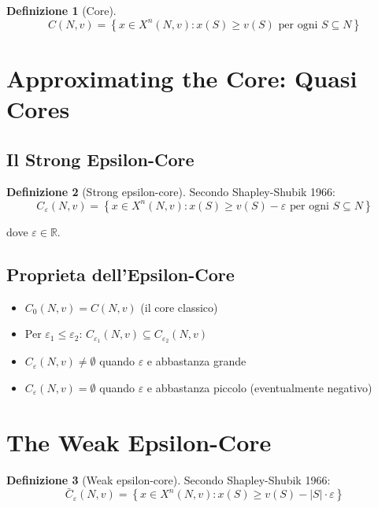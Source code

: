 \documentclass[12pt,a4paper]{article}
\theoremstyle{definition}
\newtheorem{definition}{Definizione}[section]
\begin{document}
\begin{definition}[Core]
\[
C(N, v) = \left\{ x \in X^n(N, v) : x(S) \geq v(S) \text{ per ogni } S \subseteq N \right\}
\]
\end{definition}

\newpage

\section{Approximating the Core: Quasi Cores}

\subsection*{Il Strong Epsilon-Core}

\begin{definition}[Strong epsilon-core]
Secondo Shapley-Shubik 1966:
\[
C_\varepsilon(N, v) = \left\{ x \in X^n(N, v) : x(S) \geq v(S) - \varepsilon \text{ per ogni } S \subseteq N \right\}
\]

dove $\varepsilon \in \mathbb{R}$.
\end{definition}

\subsection*{Proprieta dell'Epsilon-Core}

\begin{itemize}
    \item $C_0(N, v) = C(N, v)$ (il core classico)

    \item Per $\varepsilon_1 \leq \varepsilon_2$: $C_{\varepsilon_1}(N, v) \subseteq C_{\varepsilon_2}(N, v)$

    \item $C_\varepsilon(N, v) \neq \emptyset$ quando $\varepsilon$ e abbastanza grande

    \item $C_\varepsilon(N, v) = \emptyset$ quando $\varepsilon$ e abbastanza piccolo (eventualmente negativo)
\end{itemize}

\newpage

\section{The Weak Epsilon-Core}

\begin{definition}[Weak epsilon-core]
Secondo Shapley-Shubik 1966:
\[
\bar{C}_\varepsilon(N, v) = \left\{ x \in X^n(N, v) : x(S) \geq v(S) - |S| \cdot \varepsilon \right\}
\]
\end{definition}
\end{document}
